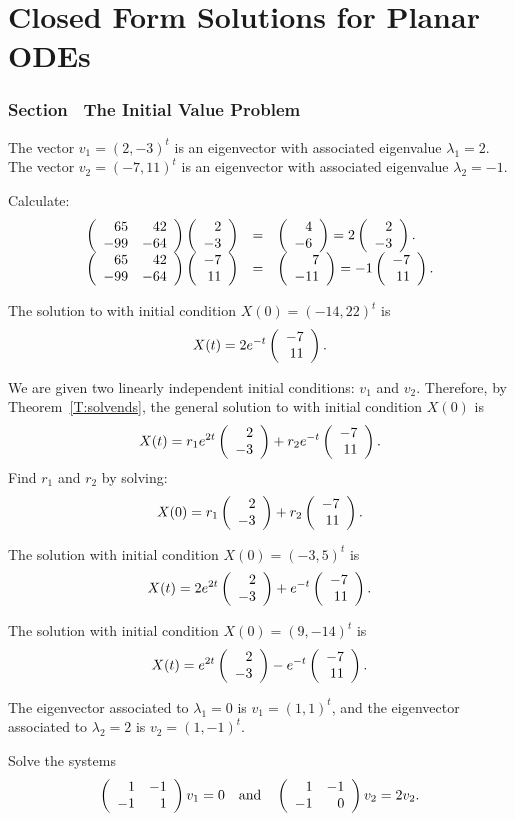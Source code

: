 \chapter{Closed Form Solutions for Planar ODEs}

\subsection*{Section~\protect{\ref{S:6.1}} The Initial Value Problem}

\ans The vector $v_1 = (2,-3)^t$ is an eigenvector with associated
eigenvalue $\lambda_1 = 2$.  The vector $v_2 = (-7,11)^t$ is an
eigenvector with associated eigenvalue $\lambda_2 = -1$.

\soln Calculate:
\[
\begin{array}{rcl}
\left(\begin{array}{rr} 65 & 42\\ -99 &-64\end{array}\right)\left(\begin{array}{r} 2 \\ -3\end{array}\right) & = & \left(\begin{array}{r} 4 \\ -6\end{array}\right) =
2\left(\begin{array}{r} 2 \\ -3\end{array}\right). \\
\left(\begin{array}{rr} 65 & 42\\ -99 &-64\end{array}\right)\left(\begin{array}{r} -7 \\ 11\end{array}\right) & = & \left(\begin{array}{r} 7 \\ -11\end{array}\right) =
-1\left(\begin{array}{r} -7 \\ 11\end{array}\right).
\end{array}
\]

 \ans The solution to  with initial
condition $X(0) = (-14,22)^t$ is
\[
X(t) = 2e^{-t}\left(\begin{array}{r} -7 \\ 11\end{array}\right).
\]

\soln We are given two linearly independent initial conditions: $v_1$
and $v_2$.  Therefore, by Theorem~\ref{T:solvends}, 
the general solution to  with initial condition $X(0)$ is
\[
X(t) = r_1e^{2t}\left(\begin{array}{r} 2 \\ -3\end{array}\right) + r_2e^{-t}\left(\begin{array}{r} -7 \\ 11\end{array}\right).
\]
Find $r_1$ and $r_2$ by solving:
\begin{equation}  \label{c6.1.03eq}
X(0) = r_1\left(\begin{array}{r} 2 \\ -3\end{array}\right) + r_2\left(\begin{array}{r} -7 \\ 11\end{array}\right).
\end{equation}

 The solution with initial condition $X(0) = (-3,5)^t$ is
\[
X(t) = 2e^{2t}\left(\begin{array}{r} 2 \\ -3\end{array}\right) + e^{-t}\left(\begin{array}{r} -7 \\ 11\end{array}\right).
\]

 The solution with initial condition  $X(0) = (9,-14)^t$ is
\[
X(t) = e^{2t}\left(\begin{array}{r} 2 \\ -3\end{array}\right) - e^{-t}\left(\begin{array}{r} -7 \\ 11\end{array}\right).
\]




\ans The eigenvector associated to $\lambda_1 = 0$ is $v_1 = (1,1)^t$,
and the eigenvector associated to $\lambda_2 = 2$ is $v_2 = (1,-1)^t$.

\soln Solve the systems
\[
\left(\begin{array}{rr} 1 & -1\\ -1 &1\end{array}\right)v_1 = 0 \quad\mbox{and}\quad \left(\begin{array}{rr} 1 & -1\\ -1 &0\end{array}\right)v_2 = 2v_2.
\]

